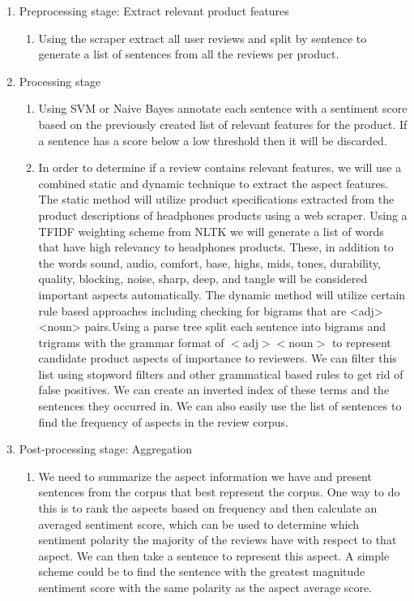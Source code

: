 \documentclass{article}
\begin{document}
\begin{enumerate}
\item Preprocessing stage: Extract relevant product features
\newline 
	\begin{enumerate} [label* = \arabic*.]
	\\
	\item Using the scraper extract all user reviews and split by sentence to generate a list of sentences from all the reviews per product.
	\end{enumerate}
\item Processing stage
	\begin{enumerate} [label* = \arabic*.]
	\item Using SVM or Naive Bayes annotate each sentence with a sentiment score based on the previously created list of relevant features for the product. If a sentence has a score below a low threshold then it will be discarded.
	\item In order to determine if a review contains relevant features, we will use a combined static and dynamic technique to extract the aspect features. The static method will utilize product specifications extracted from the product descriptions of headphones products using a web scraper. Using a TFIDF weighting scheme from NLTK we will generate a list of words that have high relevancy to headphones products. These, in addition to the words sound, audio, comfort, base, highs, mids, tones, durability, quality, blocking, noise, sharp, deep, and tangle will be considered important aspects automatically. The dynamic method will utilize certain rule based approaches including checking for bigrams that are <adj><noun> pairs.Using a parse tree split each sentence into bigrams and trigrams with the grammar format of $<$adj$><$noun$>$ to represent candidate product aspects of importance to reviewers. We can filter this list using stopword filters and other grammatical based rules to get rid of false positives. We can create an inverted index of these terms and the sentences they occurred in. We can also easily use the list of sentences to find the frequency of aspects in the review corpus.
	\end{enumerate}
\item Post-processing stage: Aggregation
	\begin{enumerate}[label* = \arabic*.]
	\item We need to summarize the aspect information we have and present sentences from the corpus that best represent the corpus. One way to do this is to rank the aspects based on frequency and then calculate an averaged sentiment score, which can be used to determine which sentiment polarity the majority of the reviews have with respect to that aspect. We can then take a sentence to represent this aspect. A simple scheme could be to find the sentence with the greatest magnitude sentiment score with the same polarity as the aspect average score.
	\end{enumerate}
\end{enumerate}
\end{document}
